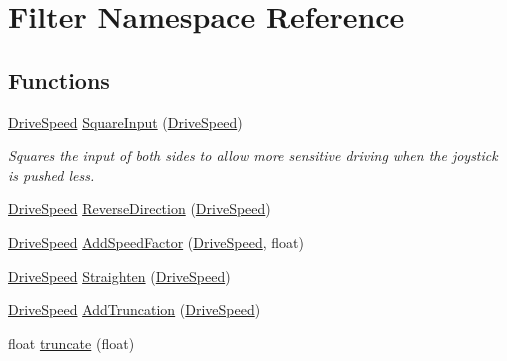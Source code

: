 \hypertarget{namespace_filter}{\section{\-Filter \-Namespace \-Reference}
\label{namespace_filter}
}
\subsection*{\-Functions}
\begin{DoxyCompactItemize}
\item 
\hyperlink{struct_drive_speed}{\-Drive\-Speed} \hyperlink{namespace_filter_a8925efb92d0a2fe45ea3b232d04b66e0}{\-Square\-Input} (\hyperlink{struct_drive_speed}{\-Drive\-Speed})
\begin{DoxyCompactList}\small\item\em \-Squares the input of both sides to allow more sensitive driving when the joystick is pushed less. \end{DoxyCompactList}\item 
\hyperlink{struct_drive_speed}{\-Drive\-Speed} \hyperlink{namespace_filter_ab262ec8a5439e144f7b03713712f8ba9}{\-Reverse\-Direction} (\hyperlink{struct_drive_speed}{\-Drive\-Speed})
\item 
\hyperlink{struct_drive_speed}{\-Drive\-Speed} \hyperlink{namespace_filter_a04ded325b9c56502f590aece56fd6d89}{\-Add\-Speed\-Factor} (\hyperlink{struct_drive_speed}{\-Drive\-Speed}, float)
\item 
\hyperlink{struct_drive_speed}{\-Drive\-Speed} \hyperlink{namespace_filter_a137af9a3ee1f11c3c1129e12aaa7ccc9}{\-Straighten} (\hyperlink{struct_drive_speed}{\-Drive\-Speed})
\item 
\hyperlink{struct_drive_speed}{\-Drive\-Speed} \hyperlink{namespace_filter_a700a12e223dd3085bc15450b9f87efb2}{\-Add\-Truncation} (\hyperlink{struct_drive_speed}{\-Drive\-Speed})
\item 
float \hyperlink{namespace_filter_a1820f44adabb671ddadacbd5e6314f31}{truncate} (float)
\end{DoxyCompactItemize}


